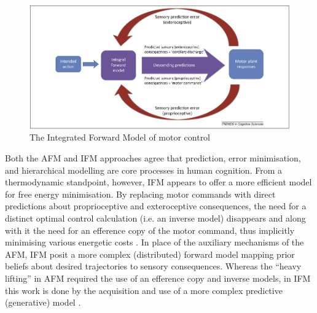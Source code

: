 \begin{CJK}{UTF8}{gbsn}
\begin{figure}[htbp]
  \begin{center}
    \includegraphics[scale=.3]{images/IFM.png}
      \caption{The Integrated Forward Model of motor control}
        \label{fig:IFM}
   \end{center}
\end{figure}


Both the AFM and IFM approaches agree that prediction, error minimisation, and hierarchical modelling are core processes in human cognition. From a thermodynamic standpoint, however, IFM appears to offer a more efficient model for free energy minimisation.  By replacing motor commands with direct predictions about proprioceptive and exteroceptive consequences, the need for a distinct optimal control calculation (i.e. an inverse model) disappears and along with it the need for an efference copy of the motor command, thus implicitly minimising various energetic costs \citep{Pickering2014,Friston2010}.   In place of the auxiliary mechanisms of the AFM, IFM posit a more complex (distributed) forward model mapping prior beliefs about desired trajectories to sensory consequences.  Whereas the ``heavy lifting'' in AFM required the use of an efference copy and inverse models, in IFM this work is done by the acquisition and use of a more complex predictive (generative) model \citep{Pickering2014}.





\end{CJK}
